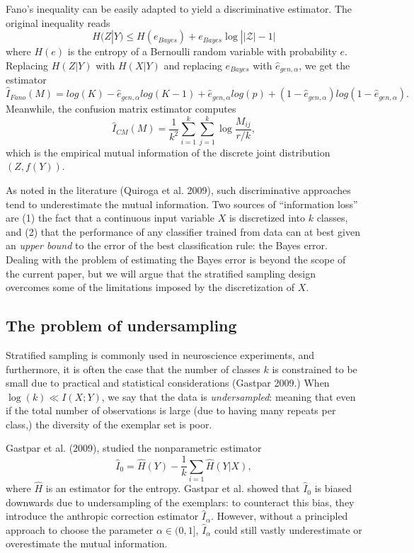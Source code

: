 \documentclass{article}
\begin{document}
Fano's inequality can be easily adapted to yield a discriminative estimator.
The original inequality reads
\[
H(Z|Y) \leq H(e_{Bayes}) + e_{Bayes} \log ||\mathcal{Z}| - 1|
\]
where $H(e)$ is the entropy of a Bernoulli random variable with probability $e$.
Replacing $H(Z|Y)$ with $H(X|Y)$ and replacing $e_{Bayes}$ with $\hat{e}_{gen, \alpha}$,
we get the estimator
\[
\hat{I}_{Fano}(M) = log(K) - \hat{e}_{gen, \alpha} log(K-1) + \hat{e}_{gen, \alpha} log(p) + (1-\hat{e}_{gen, \alpha}) log(1-\hat{e}_{gen, \alpha}).
\]
Meanwhile, the confusion matrix estimator computes
\[
\hat{I}_{CM}(M) = \frac{1}{k^2} \sum_{i=1}^k \sum_{j=1}^k \log \frac{M_{ij}}{r/k},
\]
which is the empirical mutual information of the discrete joint distribution $(Z, f(Y))$.

As noted in the literature (Quiroga et al. 2009), such
discriminative approaches tend to underestimate the mutual information.  Two sources of
``information loss'' are (1) the fact that a continuous input variable
$X$ is discretized into $k$ classes, and (2) that the performance of
any classifier trained from data can at best given an \emph{upper
  bound} to the error of the best classification rule: the Bayes
error.  Dealing with the problem of estimating the Bayes error is beyond the scope of the current paper,
but we will argue that the stratified sampling design overcomes some of the limitations
imposed by the discretization of $X$.

\subsection{The problem of undersampling}

Stratified sampling is commonly used in neuroscience experiments,
and furthermore, it is often the case that the number of classes $k$ is constrained
to be small due to practical and statistical considerations (Gastpar 2009.)
When $\log(k) \ll I(X; Y)$, we say that the data is \emph{undersampled}:
meaning that even if the total number of observations is large (due to having many repeats per class,)
the diversity of the exemplar set is poor.

Gastpar et al. (2009), studied the nonparametric estimator
\[
\hat{I}_0 = \hat{H}(Y) - \frac{1}{k}\sum_{i=1}\hat{H}(Y|X),
\]
where $\hat{H}$ is an estimator for the entropy.
Gastpar et al. showed that $\hat{I}_0$ is biased downwards due to undersampling of the exemplars:
to counteract this bias, they introduce the anthropic correction estimator $\hat{I}_\alpha$.
However, without a principled approach to choose the parameter $\alpha \in (0,1]$,
$\hat{I}_\alpha$ could still vastly underestimate or overestimate the mutual information.
\end{document}
